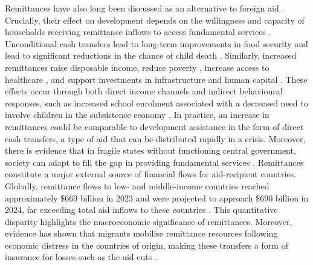 \documentclass[fleqn,10pt,twocolumn]{wlscirep}
\begin{document}
{%
Remittances have also long been discussed as an alternative to foreign aid \cite{le2011remittances}. Crucially, their effect on development depends on the willingness and capacity of households receiving remittance inflows to access fundamental services \cite{carling2020remittances}. Unconditional cash transfers lead to long-term improvements in food security and lead to significant reductions in the chance of child death \cite{aggarwal2026dynamic, pega_unconditional_2015}. Similarly, increased remittances raise disposable income, reduce poverty \cite{mbaye2017natural}, increase access to healthcare \cite{amuedo2011new}, and support investments in infrastructure and human capital \cite{musah2018migrants, salas2014international}. These effects occur through both direct income channels and indirect behavioural responses, such as increased school enrolment associated with a decreased need to involve children in the subsistence economy \cite{gyimah2015remittances}. In practice, an increase in remittances could be comparable to development assistance in the form of direct cash transfers, a type of aid that can be distributed rapidly in a crisis. Moreover, there is evidence that in fragile states without functioning central government, society can adapt to fill the gap in providing fundamental services \cite{menkhaus2006governance}. Remittances constitute a major external source of financial flows for aid-recipient countries. Globally, remittance flows to low- and middle-income countries reached approximately \$669 billion in 2023 and were projected to approach \$690 billion in 2024, far exceeding total aid inflows to these countries \cite{remittances_2024}. This quantitative disparity highlights the macroeconomic significance of remittances. Moreover, evidence has shown that migrants mobilise remittance resources following economic distress in the countries of origin, making these transfers a form of insurance for losses such as the aid cuts \cite{frankel2011bilateral}.
}
\end{document}
